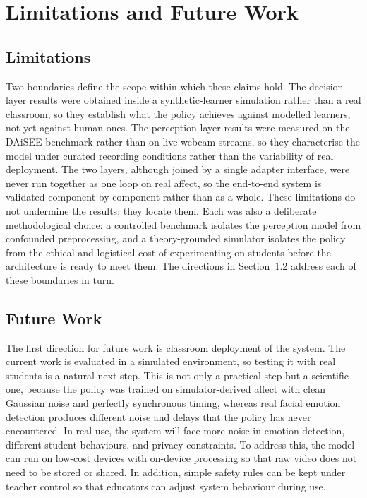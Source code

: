 \chapter{Limitations and Future Work}\label{chap:todo}

\section{Limitations}\label{sec:limitations}

Two boundaries define the scope within which these claims hold. The decision-layer results were obtained inside a synthetic-learner simulation rather than a real classroom, so they establish what the policy achieves against modelled learners, not yet against human ones. The perception-layer results were measured on the \ac{DAiSEE} benchmark rather than on live webcam streams, so they characterise the model under curated recording conditions rather than the variability of real deployment. The two layers, although joined by a single adapter interface, were never run together as one loop on real affect, so the end-to-end system is validated component by component rather than as a whole. These limitations do not undermine the results; they locate them. Each was also a deliberate methodological choice: a controlled benchmark isolates the perception model from confounded preprocessing, and a theory-grounded simulator isolates the policy from the ethical and logistical cost of experimenting on students before the architecture is ready to meet them. The directions in Section~\ref{sec:future_work} address each of these boundaries in turn.

\section{Future Work}\label{sec:future_work}

The first direction for future work is classroom deployment of the system. The current work is evaluated in a simulated environment, so testing it with real students is a natural next step. This is not only a practical step but a scientific one, because the policy was trained on simulator-derived affect with clean Gaussian noise and perfectly synchronous timing, whereas real facial emotion detection produces different noise and delays that the policy has never encountered. In real use, the system will face more noise in emotion detection, different student behaviours, and privacy constraints. To address this, the model can run on low-cost devices with on-device processing so that raw video does not need to be stored or shared. In addition, simple safety rules can be kept under teacher control so that educators can adjust system behaviour during use.

